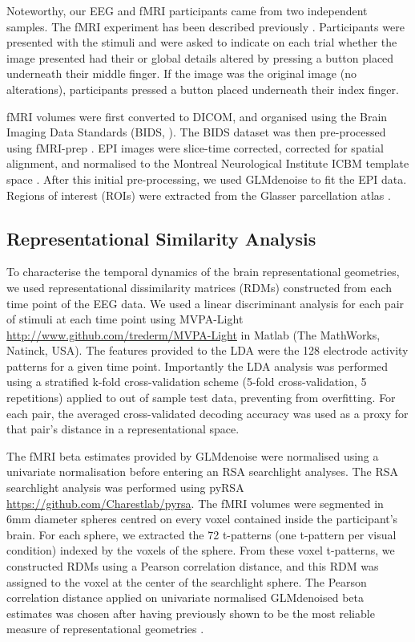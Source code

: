 \documentclass[10pt,letterpaper]{article}
\begin{document}
Noteworthy, our EEG and fMRI participants came from two independent 
samples.  The fMRI experiment has been described previously 
\cite{Charest2014-zn}. Participants were presented with the 
stimuli and were asked to indicate on each trial whether the 
image presented had their or global details altered by pressing 
a button placed underneath their middle finger. If the image was 
the original image (no alterations), participants pressed a button 
placed underneath their index finger.  

fMRI volumes were first converted to DICOM, and organised using the 
Brain Imaging Data Standards (BIDS, \cite{Gorgolewski2016-ot}). The 
BIDS dataset was then pre-processed using fMRI-prep \cite{Esteban2019-od}. 
EPI images were slice-time corrected, corrected for spatial alignment, 
and normalised to the Montreal Neurological Institute ICBM template 
space \cite{Mazziotta2001-lt}. After this initial pre-processing, we 
used GLMdenoise \cite{Kay2013-in,Charest2018-mk} to fit the 
EPI data. Regions of interest (ROIs) were extracted from
the Glasser parcellation atlas \cite{Glasser2016-xv}. 

\subsection{Representational Similarity Analysis}

To characterise the temporal dynamics of the brain representational 
geometries, we used representational dissimilarity matrices (RDMs) 
constructed from each time point of the EEG data. We used a linear 
discriminant analysis for each pair of stimuli at each time point 
using MVPA-Light \url{http://www.github.com/trederm/MVPA-Light} in 
Matlab (The MathWorks, Natinck, USA). The features provided to 
the LDA were the 128 electrode activity patterns for a given time 
point. Importantly the LDA analysis was performed using a stratified 
k-fold cross-validation scheme (5-fold cross-validation, 5 repetitions) 
applied to out of sample test data, preventing from overfitting. For 
each pair, the averaged cross-validated decoding accuracy was used 
as a proxy for that pair’s distance in a representational space.

The fMRI beta estimates provided by GLMdenoise were normalised 
using a univariate normalisation \cite{Misaki2010-mb} before 
entering an RSA searchlight analyses. The RSA searchlight analysis 
was performed using pyRSA \url{https://github.com/Charestlab/pyrsa}.
The fMRI volumes were segmented in 6mm diameter spheres centred 
on every voxel contained inside the participant’s brain. For each 
sphere, we extracted the 72 t-patterns (one t-pattern per visual 
condition) indexed by the voxels of the sphere. From these voxel 
t-patterns, we constructed RDMs using a Pearson correlation distance, 
and this RDM was assigned to the voxel at the center of the 
searchlight sphere. The Pearson correlation distance applied on 
univariate normalised GLMdenoised beta estimates was chosen after 
having previously shown to be the most reliable measure of 
representational geometries \cite{Charest2018-mk}. 
\end{document}

